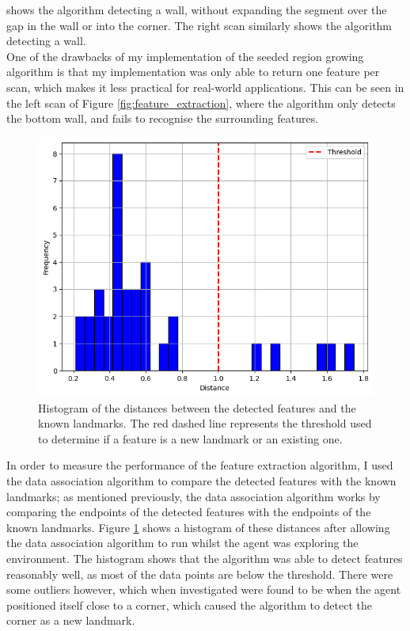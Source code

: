 \documentclass[12pt]{article}
\begin{document}
shows the algorithm detecting a wall, without expanding the segment over the gap in the wall or into the corner. The right scan
similarly shows the algorithm detecting a wall.\\
One of the drawbacks of my implementation of the seeded region growing algorithm is that my implementation was only able to return
one feature per scan, which makes it less practical for real-world applications. This can be seen in the left scan of Figure \ref{fig:feature_extraction},
where the algorithm only detects the bottom wall, and fails to recognise the surrounding features. \\
\begin{figure}[h]
    \centering
    \includegraphics[width=0.7\linewidth]{histo}
    \caption{Histogram of the distances between the detected features and the known landmarks. The red dashed line represents the
    threshold used to determine if a feature is a new landmark or an existing one.}
    \label{fig:FE_histogram}
\end{figure}
In order to measure the performance of the feature extraction algorithm, I used the data association algorithm to compare the
detected features with the known landmarks; as mentioned previously, the data association algorithm works by comparing the endpoints
of the detected features with the endpoints of the known landmarks. Figure \ref{fig:FE_histogram} shows a histogram of these distances
after allowing the data association algorithm to run whilst the agent was exploring the environment. The histogram shows that the
algorithm was able to detect features reasonably well, as most of the data points are below the threshold.
There were some outliers however, which when investigated were found to be when the agent positioned itself close to a corner, which
caused the algorithm to detect the corner as a new landmark.\\
\end{document}
